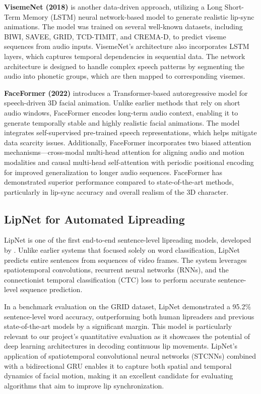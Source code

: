 \documentclass[12pt]{article}
\begin{document}
\textbf{VisemeNet (2018)} \cite{Zhou2018visemenet} is another data-driven approach, utilizing a Long Short-Term Memory (LSTM) neural network-based model to generate realistic lip-sync animations. The model was trained on several well-known datasets, including BIWI, SAVEE, GRID, TCD-TIMIT, and CREMA-D, to predict viseme sequences from audio inputs. VisemeNet’s architecture also incorporates LSTM layers, which captures temporal dependencies in sequential data. The network architecture is designed to handle complex speech patterns by segmenting the audio into phonetic groups, which are then mapped to corresponding visemes. 

\label{ref:faceformer} \textbf{FaceFormer (2022)} \cite{fan2022faceformer} introduces a Transformer-based autoregressive model for speech-driven 3D facial animation. Unlike earlier methods that rely on short audio windows, FaceFormer encodes long-term audio context, enabling it to generate temporally stable and highly realistic facial animations. The model integrates self-supervised pre-trained speech representations, which helps mitigate data scarcity issues. Additionally, FaceFormer incorporates two biased attention mechanisms—cross-modal multi-head attention for aligning audio and motion modalities and causal multi-head self-attention with periodic positional encoding for improved generalization to longer audio sequences. FaceFormer has demonstrated superior performance compared to state-of-the-art methods, particularly in lip-sync accuracy and overall realism of the 3D character.

\subsection{LipNet for Automated Lipreading}
\label{ref:lipnet}
LipNet is one of the first end-to-end sentence-level lipreading models, developed by \cite{assael2016lipnet}. Unlike earlier systems that focused solely on word classification, LipNet predicts entire sentences from sequences of video frames. The system leverages spatiotemporal convolutions, recurrent neural networks (RNNs), and the connectionist temporal classification (CTC) loss to perform accurate sentence-level sequence prediction.

In a benchmark evaluation on the GRID dataset, LipNet demonstrated a 95.2\% sentence-level word accuracy, outperforming both human lipreaders and previous state-of-the-art models by a significant margin. This model is particularly relevant to our project’s quantitative evaluation as it showcases the potential of deep learning architectures in decoding continuous lip movements. LipNet's application of spatiotemporal convolutional neural networks (STCNNs) combined with a bidirectional GRU enables it to capture both spatial and temporal dynamics of facial motion, making it an excellent candidate for evaluating algorithms that aim to improve lip synchronization.
\end{document}
